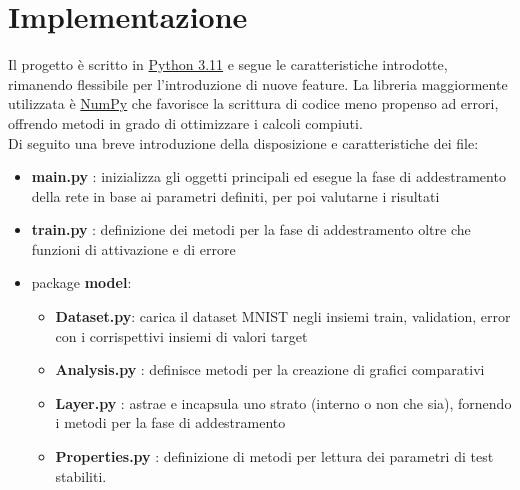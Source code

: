 \chapter{Implementazione}
Il progetto è scritto in \href{https://www.python.org/downloads/release/python-3110/}{Python 3.11} e segue le caratteristiche introdotte, rimanendo flessibile per l'introduzione di nuove feature. La libreria maggiormente utilizzata è \href{https://numpy.org/}{NumPy} che favorisce la scrittura di codice meno propenso ad errori, offrendo metodi in grado di ottimizzare i calcoli compiuti. \\
Di seguito una breve introduzione della disposizione e caratteristiche dei file:
\begin{itemize}
    \item \textbf{main.py} : inizializza gli oggetti principali ed esegue la fase di addestramento della rete in base ai parametri definiti, per poi valutarne i risultati
    \item \textbf{train.py} : definizione dei metodi per la fase di addestramento oltre che funzioni di attivazione e di errore
    \item package \textbf{model}:
    \begin{itemize}
        \item \textbf{Dataset.py}: carica il dataset MNIST negli insiemi train, validation, error con i corrispettivi insiemi di valori target 
        \item \textbf{Analysis.py} : definisce metodi per la creazione di grafici comparativi
        \item \textbf{Layer.py} : astrae e incapsula uno strato (interno o non che sia), fornendo i metodi per la fase di addestramento
        \item \textbf{Properties.py} : definizione di metodi per lettura dei parametri di test stabiliti.
    \end{itemize}
\end{itemize}


